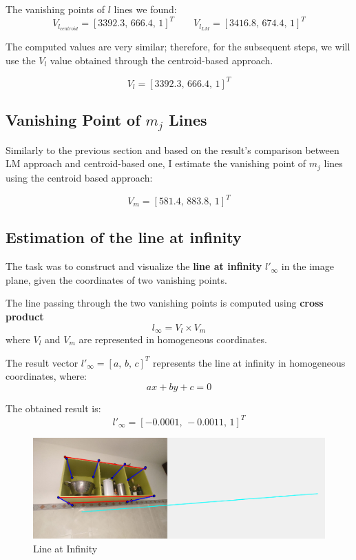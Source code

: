 The vanishing points of $l$ lines we found:
$$
V_{l_{centroid}} = [3392.3, \, 666.4, \, 1]^T \qquad V_{l_{LM}} = [3416.8, \, 674.4, \, 1]^T
$$

The computed values are very similar; therefore, for the subsequent steps, we will use the $V_l$ value obtained through the centroid-based approach.

$$V_l = [3392.3, \, 666.4, \, 1]^T$$

\subsection[Vanishing Point of \textit{m} Lines]{Vanishing Point of $m_j$ Lines}
Similarly to the previous section and based on the result's comparison between LM approach and centroid-based one, I estimate the vanishing point of $m_j$ lines using the centroid based approach:

$$
V_m = [581.4, \, 883.8, \, 1]^T
$$

\subsection{Estimation of the line at infinity}
The task was to construct and visualize the \textbf{line at infinity} $l'_\infty$ in the image plane, given the coordinates of two vanishing points. 

The line passing through the two vanishing points is computed using \textbf{cross product}
$$l_\infty = V_l \times V_m$$
where $V_l$ and $V_m$ are represented in homogeneous coordinates.

The result vector $l'_\infty = [a, \, b, \, c]^T$ represents the line at infinity in homogeneous coordinates, where:
$$ax + by + c = 0$$

The obtained result is:
$$l'_\infty = [-0.0001, \, -0.0011, \, 1]^T $$
\begin{figure}[H]
    \centering
    \includegraphics[width=0.95\linewidth]{img/G1/line_at_infinity.jpg}
    \caption{Line at Infinity}
    \label{fig:lineAtInfinity}
\end{figure}